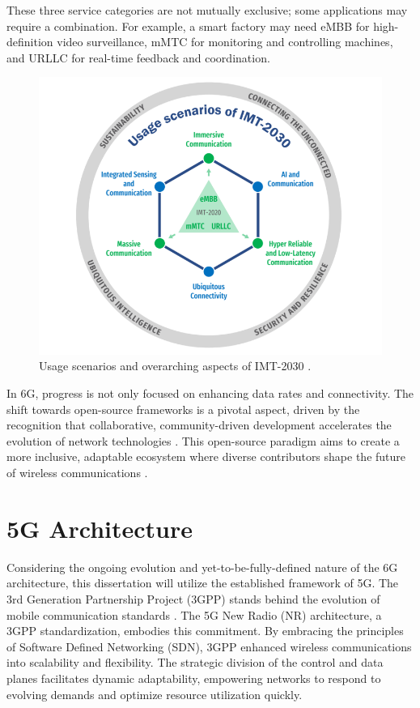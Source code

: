 These three service categories are not mutually exclusive; some applications may require a combination. For example, a smart factory may need eMBB for high-definition video surveillance, mMTC for monitoring and controlling machines, and URLLC for real-time feedback and coordination. 

\begin{figure}[H]
    \centering
    \includegraphics[width=0.5\linewidth]{figures/usage 6g.png}
    \caption[Usage scenarios and overarching aspects of IMT-2030]{Usage scenarios and overarching aspects of IMT-2030 \cite{ITU_2160-0}.}
    \label{fig:6g_usage}
\end{figure}

In 6G, progress is not only focused on enhancing data rates and connectivity. The shift towards open-source frameworks is a pivotal aspect, driven by the recognition that collaborative, community-driven development accelerates the evolution of network technologies \cite{6G_SOA}. This open-source paradigm aims to create a more inclusive, adaptable ecosystem where diverse contributors shape the future of wireless communications \cite{6G_SOA}.


\section{5G Architecture} \label{sec:5g_arch}

Considering the ongoing evolution and yet-to-be-fully-defined nature of the 6G architecture, this dissertation will utilize the established framework of 5G. The 3rd Generation Partnership Project (3GPP) stands behind the evolution of mobile communication standards \cite{3GPP_about_us}. The 5G New Radio (NR) architecture, a 3GPP standardization, embodies this commitment. By embracing the principles of Software Defined Networking (SDN), 3GPP enhanced wireless communications into scalability and flexibility. The strategic division of the control and data planes facilitates dynamic adaptability, empowering networks to respond to evolving demands and optimize resource utilization quickly.

